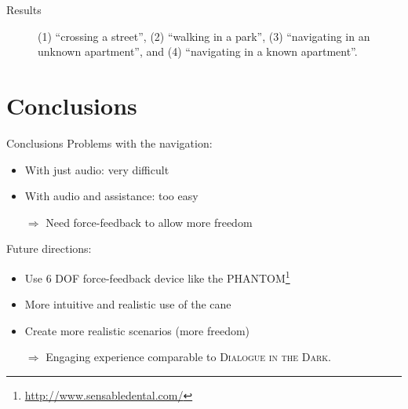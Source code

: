 \documentclass{beamer}
\begin{document}
\begin{frame}{Results}

\begin{figure}[tb]
\centering


\caption{(1) ``crossing a street'', (2) ``walking in a park'', (3) ``navigating in an unknown apartment'',
and (4) ``navigating in a known apartment''.}
\label{fig:results}
\end{figure}

\end{frame}

\section{Conclusions}

\begin{frame}{Conclusions}
Problems with the navigation:
\begin{itemize}
  \item With just audio: very difficult
  \item With audio and assistance: too easy
  \item[$\Rightarrow$] Need force-feedback to allow more freedom
\end{itemize}
\vspace{0.5em}
\pause
Future directions:
\begin{itemize}
  \item Use 6 DOF force-feedback device like the
  \textsc{PHANTOM}\footnote{\url{http://www.sensabledental.com/}}
  \item More intuitive and realistic use of the cane
  \item Create more realistic scenarios (more freedom)
  \item[$\Rightarrow$] Engaging experience comparable to \textsc{Dialogue in the
  Dark}.
\end{itemize}
\end{frame}
\end{document}
